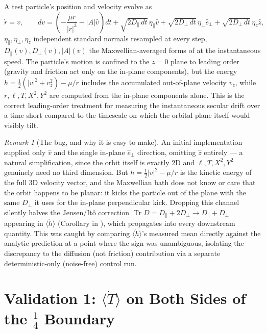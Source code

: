 \documentclass[12pt]{amsart}
\theoremstyle{plain}
\theoremstyle{remark}
\newtheorem*{remark}{Remark}
\begin{document}
A test particle's position and velocity evolve as
\begin{equation}
\dot r = v, \qquad dv = \left(-\frac{\mu r}{|r|^3} - |A|\hat v\right)dt + \sqrt{2D_\parallel\,dt}\,\eta_\parallel\hat v + \sqrt{2D_\perp\,dt}\,\eta_\perp\hat e_\perp + \sqrt{2D_\perp\,dt}\,\eta_z\hat z, \tag{1}
\end{equation}
$\eta_\parallel,\eta_\perp,\eta_z$ independent standard normals resampled at every step, $D_\parallel(v),D_\perp(v),|A|(v)$ the Maxwellian-averaged forms of \cite{Ebert2026Rosenbluth} at the instantaneous speed. The particle's motion is confined to the $z=0$ plane to leading order (gravity and friction act only on the in-plane components), but the energy $h=\tfrac12(|v|^2+v_z^2)-\mu/r$ includes the accumulated out-of-plane velocity $v_z$, while $r,\ell,T,X^2,Y^2$ are computed from the in-plane components alone. This is the correct leading-order treatment for measuring the instantaneous secular drift over a time short compared to the timescale on which the orbital plane itself would visibly tilt.

\begin{remark}[The bug, and why it is easy to make]
An initial implementation supplied only $\hat v$ and the single in-plane $\hat e_\perp$ direction, omitting $\hat z$ entirely --- a natural simplification, since the orbit itself is exactly 2D and $\ell,T,X^2,Y^2$ genuinely need no third dimension. But $h=\tfrac12|v|^2-\mu/r$ is the kinetic energy of the full 3D velocity vector, and the Maxwellian bath does not know or care that the orbit happens to be planar: it kicks the particle out of the plane with the same $D_\perp$ it uses for the in-plane perpendicular kick. Dropping this channel silently halves the Jensen/It\^o correction $\operatorname{Tr}D=D_\parallel+2D_\perp\to D_\parallel+D_\perp$ appearing in $\langle\dot h\rangle$ (Corollary in \cite{Ebert2026Rest}), which propagates into every downstream quantity. This was caught by comparing $\langle\dot h\rangle$'s measured mean directly against the analytic prediction at a point where the sign was unambiguous, isolating the discrepancy to the diffusion (not friction) contribution via a separate deterministic-only (noise-free) control run.
\end{remark}

\section{Validation 1: $\langle\dot T\rangle$ on Both Sides of the $\tfrac14$ Boundary}
\end{document}
